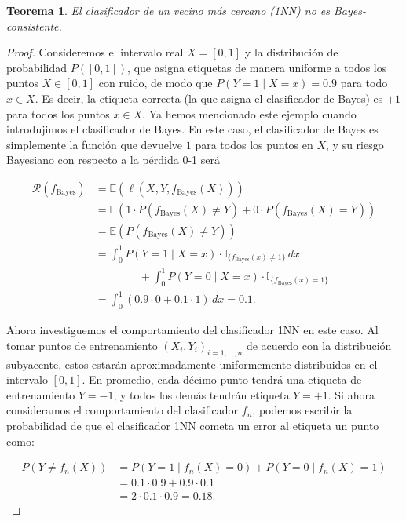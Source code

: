 \documentclass{report}
\newtheorem{thm}{Teorema}[subsection]
\begin{document}
\begin{thm}
    El clasificador de un vecino más cercano (1NN) no es Bayes-consistente.
\end{thm}

\begin{proof}

Consideremos 
el intervalo real \(X = [0, 1]\) y la distribución de probabilidad \(P([0, 1])\),  que asigna etiquetas 
de manera uniforme a todos los puntos \(X \in [0, 1]\) con ruido, de modo que 
\(P(Y = 1 \mid X = x) = 0.9\) para todo \(x \in X\). Es decir, la etiqueta correcta (la que 
asigna el clasificador de Bayes) es \(+1\) para todos los puntos \(x \in X\). Ya hemos mencionado 
este ejemplo cuando introdujimos el clasificador de Bayes. En este caso, el clasificador de Bayes 
es simplemente la función que devuelve \(1\) para todos los puntos en \(X\), y su riesgo Bayesiano 
con respecto a la pérdida 0-1 será

\[
\begin{aligned}
    \mathcal{R}(f_{\text{Bayes}}) & = \mathbb{E}(\ell(X,Y,f_{\text{Bayes}}(X))) \\
    & = \mathbb{E}(1\cdot P(f_{\text{Bayes}}(X)\neq Y) + 0 \cdot P(f_{\text{Bayes}}(X) = Y))\\
    & = \mathbb{E}(P(f_{\text{Bayes}}(X)\neq Y))\\
    & = \int_{0}^{1} P(Y = 1 \mid X = x) \cdot \mathbb{I}_{\{f_{\text{Bayes}}(x) \neq 1\}} \, dx \\
    & \qquad \qquad + \int_{0}^{1} P(Y=0 \mid X=x) \cdot \mathbb{I}_{\{f_{\text{Bayes}}(x) = 1\}} \\
    & = \int_{0}^{1} (0.9 \cdot 0 + 0.1 \cdot 1) \, dx = 0.1.
\end{aligned}
\]

Ahora investiguemos el comportamiento del clasificador 1NN 
en este caso. Al tomar puntos de entrenamiento \((X_i, Y_i)_{i=1,\dots,n}\) de acuerdo con la 
distribución subyacente, estos estarán aproximadamente uniformemente distribuidos en el intervalo 
\([0, 1]\). En promedio, cada décimo punto tendrá una etiqueta de entrenamiento \(Y = -1\), y todos 
los demás tendrán etiqueta \(Y = +1\). Si ahora consideramos el comportamiento del clasificador \(f_n\), 
podemos escribir la probabilidad de que el clasificador 1NN cometa un error al etiqueta un punto como:

\[
\begin{aligned}
P(Y \neq f_n(X)) & = P(Y = 1 \mid f_n(X) = 0) + P(Y = 0 \mid f_n(X) = 1) \\
                 & = 0.1 \cdot 0.9 + 0.9 \cdot 0.1 \\
                 & = 2 \cdot 0.1 \cdot 0.9 = 0.18.
\end{aligned}
\]


\end{proof}
\end{document}
